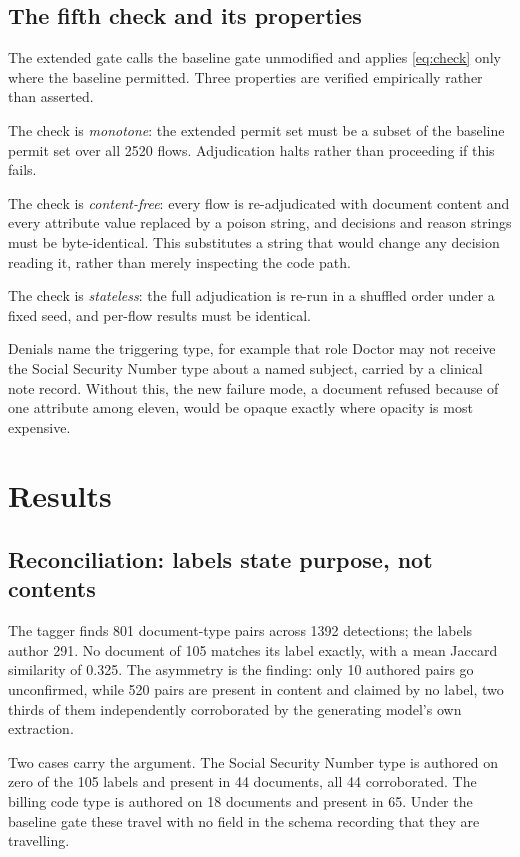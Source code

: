 \documentclass[conference]{IEEEtran}
\begin{document}
\subsection{The fifth check and its properties}
The extended gate calls the baseline gate unmodified and applies
\eqref{eq:check} only where the baseline permitted. Three properties are
verified empirically rather than asserted.

The check is \emph{monotone}: the extended permit set must be a subset of the
baseline permit set over all 2520 flows. Adjudication halts rather than
proceeding if this fails.

The check is \emph{content-free}: every flow is re-adjudicated with document
content and every attribute value replaced by a poison string, and decisions and
reason strings must be byte-identical. This substitutes a string that would
change any decision reading it, rather than merely inspecting the code path.

The check is \emph{stateless}: the full adjudication is re-run in a shuffled
order under a fixed seed, and per-flow results must be identical.

Denials name the triggering type, for example that role Doctor may not receive
the Social Security Number type about a named subject, carried by a clinical
note record. Without this, the new failure mode, a document refused because of
one attribute among eleven, would be opaque exactly where opacity is most
expensive.

\section{Results}

\subsection{Reconciliation: labels state purpose, not contents}
\label{sec:recon}
The tagger finds 801 document-type pairs across 1392 detections; the labels
author 291. No document of 105 matches its label exactly, with a mean Jaccard
similarity of 0.325. The asymmetry is the finding: only 10 authored pairs go
unconfirmed, while 520 pairs are present in content and claimed by no label, two
thirds of them independently corroborated by the generating model's own
extraction.

Two cases carry the argument. The Social Security Number type is authored on
zero of the 105 labels and present in 44 documents, all 44 corroborated. The
billing code type is authored on 18 documents and present in 65. Under the
baseline gate these travel with no field in the schema recording that they are
travelling.
\end{document}

